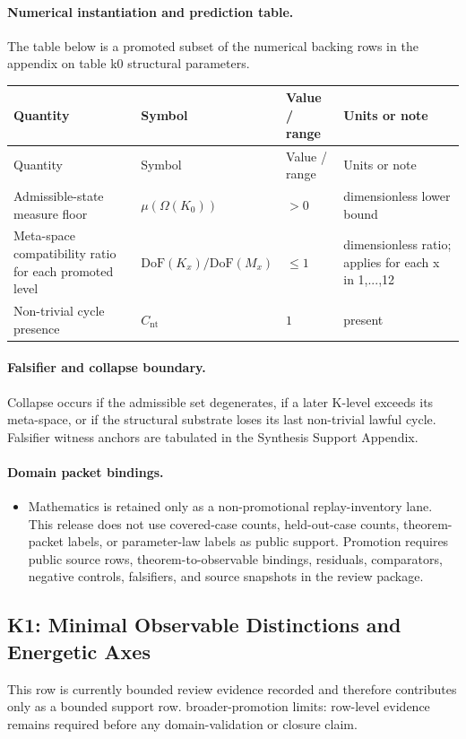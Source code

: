 \paragraph{Numerical instantiation and prediction table.}
The table below is a promoted subset of the numerical backing rows in the appendix on table k0 structural parameters.
\begin{longtable}{@{}L{0.27\textwidth}L{0.15\textwidth}L{0.24\textwidth}L{0.16\textwidth}@{}}
\toprule
Quantity & Symbol & Value / range & Units or note \\
\midrule
\endfirsthead
\toprule
Quantity & Symbol & Value / range & Units or note \\
\midrule
\endhead
Admissible-state measure floor & $\scriptstyle \mu(\Omega(K_0))$ & $> 0$ & dimensionless lower bound \\
Meta-space compatibility ratio for each promoted level & $\scriptstyle \mathrm{DoF}(K_x)/\allowbreak \mathrm{DoF}(M_x)$ & $\leq 1$ & dimensionless ratio; applies for each x in 1,...,12 \\
Non-trivial cycle presence & $\scriptstyle C_{\mathrm{nt}}$ & $1$ & present \\
\bottomrule
\end{longtable}

\paragraph{Falsifier and collapse boundary.}
Collapse occurs if the admissible set degenerates, if a later K-level exceeds its meta-space, or if the structural substrate loses its last non-trivial lawful cycle.
Falsifier witness anchors are tabulated in the Synthesis Support Appendix.

\paragraph{Domain packet bindings.}
\begin{itemize}[leftmargin=1.6em,nosep]
\item Mathematics is retained only as a non-promotional replay-inventory lane. This release does not use covered-case counts, held-out-case counts, theorem-packet labels, or parameter-law labels as public support. Promotion requires public source rows, theorem-to-observable bindings, residuals, comparators, negative controls, falsifiers, and source snapshots in the review package.
\end{itemize}

\subsection{K1: Minimal Observable Distinctions and Energetic Axes}
\label{sec:oc-core-1-3-synthesis-k1}
This row is currently bounded review evidence recorded and therefore contributes only as a bounded support row.
broader-promotion limits: row-level evidence remains required before any domain-validation or closure claim.


